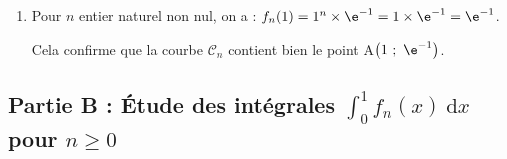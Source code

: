 \begin{enumerate}
\begin{enumerate}
Enfin, calculons la limite de $f_n$ quand $x$ tend vers $+\infty$ :

$\forall x \in ]0~;~+\infty[,\quad f_n(x) = x^{n}\e^{-x} = \dfrac{x^{n}}{\e^{x}} = \dfrac{1}{~\dfrac{\e^{x}}{x^{n}}}$

La propriété des croissances comparées dit que, pour tout $n$ naturel non nul :\quad $\lim\limits_{x \to +\infty} \dfrac{\e^{x}}{x^n} = +\infty$;

Par limite du quotient, on en déduit :\quad $ \lim\limits_{x \to +\infty} f_n(x) = \lim\limits_{x \to+\infty} \dfrac{1}{~\dfrac{\e^{x}}{x^{n}}~} = 0$.

La courbe $\mathcal{C}_n$ admet donc une asymptote horizontale d'équation $y = 0$ au voisinage de $+\infty$.

On a ainsi justifié tous les éléments de ce tableau de variations.
	\end{enumerate}

\item Pour $n$ entier naturel non nul, on a : \quad $f_n(1) = 1^{n}\times \e^{-1} = 1\times \e^{-1} = \e^{-1}$.

Cela confirme que la courbe $\mathcal{C}_n$ contient bien le point A$\left(1~;~\e^{-1}\right)$.
\end{enumerate}

\subsection*{Partie B : Étude des intégrales \quad \boldmath$\displaystyle \int_{0}^{1}f_n(x) ~\mathrm{d}x$\unboldmath \quad pour \quad \boldmath$n \geqslant 0$\unboldmath}

